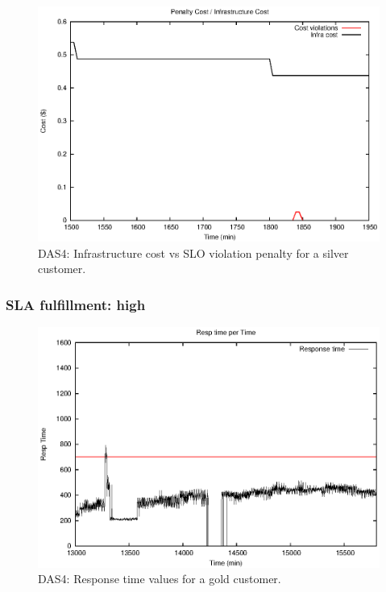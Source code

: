 \begin{figure}
  \begin{center}
    \includegraphics[width=.85\linewidth]{images/exps2011/medium/das/penaltyVScost_filtered.eps}
  \end{center}
\vspace{-5mm}
  \caption{DAS4: Infrastructure cost vs SLO violation penalty for a silver customer.}
  \label{mediumPenalty}
\end{figure}

\subsubsection{SLA fulfillment: high}

\begin{figure}
  \begin{center}
    \includegraphics[width=.85\linewidth]{images/exps2011/high/das/proxyDataPoints_output_filtered.eps}
  \end{center}
\vspace{-5mm}
  \caption{DAS4: Response time values for a gold customer.}
  \label{highResponseTime}
\end{figure}


